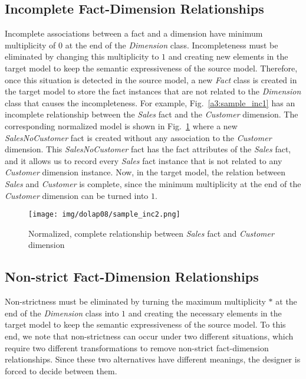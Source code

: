\subsection{Incomplete Fact-Dimension Relationships}
Incomplete associations between a fact and a dimension have minimum
multiplicity of $0$ at the end of the \emph{Dimension} class.
Incompleteness must be eliminated by changing this multiplicity to
$1$ and creating new elements in the target model to keep the
semantic expressiveness of the source model. Therefore, once this
situation is detected in the source model, a new \emph{Fact} class
is created in the target model to store the fact instances that are
not related to the \emph{Dimension} class that causes the
incompleteness. For example, Fig.~\ref{a3:sample_inc1} has an
incomplete relationship between the \emph{Sales} fact and the
\emph{Customer} dimension. The corresponding normalized model is
shown in Fig.~\ref{a3:sample_inc2} where a new
\emph{SalesNoCustomer} fact is created without any association to
the \emph{Customer} dimension. This \emph{SalesNoCustomer} fact has
the fact attributes of the \emph{Sales} fact, and it allows us to
record every \emph{Sales} fact instance that is not related to any
\emph{Customer} dimension instance. Now, in the target model, the
relation between \emph{Sales} and \emph{Customer} is complete, since
the minimum multiplicity at the end of the \emph{Customer} dimension
can be turned into $1$.

\begin{figure}
\begin{center}
\texttt{[image: img/dolap08/sample\_inc2.png]}
\end{center}
\caption{Normalized, complete relationship between \emph{Sales} fact
and \emph{Customer} dimension} \label{a3:sample_inc2}
\end{figure}

\subsection{Non-strict Fact-Dimension Relationships}
Non-strictness must be eliminated by turning the maximum
multiplicity $*$ at the end of the \emph{Dimension} class into $1$
and creating the necessary elements in the target model to keep the
semantic expressiveness of the source model. To this end, we note
that non-strictness can occur under two different situations, which
require two different transformations to remove non-strict
fact-dimension relationships. Since these two alternatives have
different meanings, the designer is forced to decide between them.

